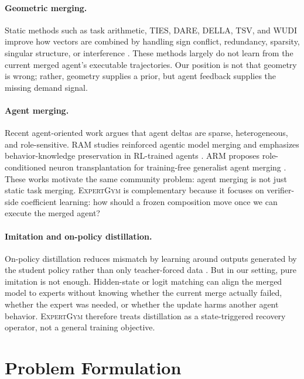 \documentclass[11pt]{article}
\newcommand{\method}{\textsc{ExpertGym}\xspace}
\begin{document}
\paragraph{Geometric merging.}  Static methods such as task arithmetic, TIES, DARE, DELLA, TSV, and WUDI improve how vectors are combined by handling sign conflict, redundancy, sparsity, singular structure, or interference \citep{ilharco2023editing,yadav2023ties,yu2023dare,deep2024della,gargiulo2025tsv,cheng2025wudi}.  These methods largely do not learn from the current merged agent's executable trajectories.  Our position is not that geometry is wrong; rather, geometry supplies a prior, but agent feedback supplies the missing demand signal.

\paragraph{Agent merging.}  Recent agent-oriented work argues that agent deltas are sparse, heterogeneous, and role-sensitive.  RAM studies reinforced agentic model merging and emphasizes behavior-knowledge preservation in RL-trained agents \citep{yuan2026ram}.  ARM proposes role-conditioned neuron transplantation for training-free generalist agent merging \citep{feng2026arm}.  These works motivate the same community problem: agent merging is not just static task merging.  \method is complementary because it focuses on verifier-side coefficient learning: how should a frozen composition move once we can execute the merged agent?

\paragraph{Imitation and on-policy distillation.}  On-policy distillation reduces mismatch by learning around outputs generated by the student policy rather than only teacher-forced data \citep{agarwal2024gkd}.  But in our setting, pure imitation is not enough.  Hidden-state or logit matching can align the merged model to experts without knowing whether the current merge actually failed, whether the expert was needed, or whether the update harms another agent behavior.  \method therefore treats distillation as a state-triggered recovery operator, not a general training objective.

\section{Problem Formulation}
\end{document}
